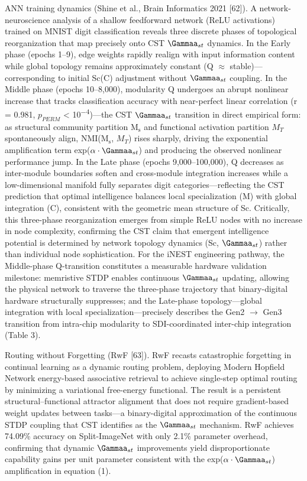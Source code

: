\documentclass[a4paper,12pt]{article}
\providecommand{\textsubscript}[1]{\ensuremath{_{\text{#1}}}}
\begin{document}
ANN training dynamics (Shine et al., Brain Informatics 2021 [62]).
A network-neuroscience analysis of a shallow feedforward network (ReLU activations) trained on MNIST digit classification reveals three discrete phases of topological reorganization that map precisely onto CST $\Gammaa_{st}$ dynamics.
In the Early phase (epochs 1--9), edge weights rapidly realign with input information content while global topology remains approximately constant (Q  $\approx$  stable)---corresponding to initial Sc(C) adjustment without $\Gammaa_{st}$ coupling.
In the Middle phase (epochs 10--8,000), modularity Q undergoes an abrupt nonlinear increase that tracks classification accuracy with near-perfect linear correlation (r = 0.981, $p_{PERM}$ < 10\textsuperscript{$-$}\textsuperscript{4})---the CST $\Gammaa_{st}$ transition in direct empirical form: as structural community partition M\textsubscript{s} and functional activation partition $M_{T}$ spontaneously align, NMI(M\textsubscript{s}, $M_{T}$) rises sharply, driving
the exponential amplification term exp($\alpha \cdot \Gammaa_{st}$) and producing the observed nonlinear performance jump.
In the Late phase (epochs 9,000--100,000), Q decreases as inter-module boundaries soften and cross-module integration increases while a low-dimensional manifold fully separates digit categories---reflecting the CST prediction that optimal intelligence balances local specialization (M) with global integration (C), consistent with the geometric mean structure of Sc.
Critically, this three-phase reorganization emerges from simple ReLU nodes with no increase in node complexity, confirming the CST claim that emergent intelligence potential is determined by network topology dynamics (Sc, $\Gammaa_{st}$) rather than individual node sophistication.
For the iNEST engineering pathway, the Middle-phase Q-transition constitutes a measurable hardware validation milestone: memristive STDP enables continuous $\Gammaa_{st}$ updating, allowing the physical network to traverse the three-phase trajectory that binary-digital hardware structurally suppresses; and the Late-phase topology---global integration with local specialization---precisely describes
the Gen2 $\rightarrow$ Gen3 transition from intra-chip modularity to SDI-coordinated inter-chip integration (Table 3).

Routing without Forgetting (RwF [63]).
RwF recasts catastrophic forgetting in continual learning as a dynamic routing problem, deploying Modern Hopfield Network energy-based associative retrieval to achieve single-step optimal routing by minimizing a variational free-energy functional.
The result is a persistent structural--functional attractor alignment that does not require gradient-based weight updates between tasks---a binary-digital approximation of the continuous STDP coupling that CST identifies as the $\Gammaa_{st}$ mechanism.
RwF achieves 74.09\% accuracy on Split-ImageNet with only 2.1\% parameter overhead, confirming that dynamic $\Gammaa_{st}$ improvements yield disproportionate capability gains per unit parameter consistent with the exp($\alpha \cdot \Gammaa_{st}$) amplification in equation (1).
\end{document}
